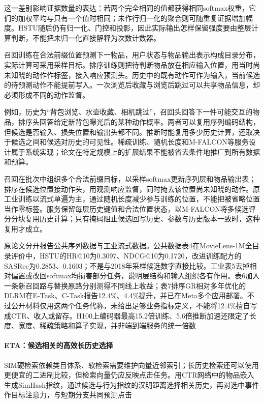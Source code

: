 这一差别影响证据数量的表达：若两个完全相同的值都获得相同softmax权重，它们的加权平均与只有一个值时相同；未作行归一化的聚合则可随重复证据增加幅度。HSTU随后仍有归一化、门控和投影，因此实际输出怎样保留强度要由整层计算判断，不能把未归一化直接解释为次数计数器。

召回训练在合法前缀位置预测下一物品，用户状态与物品输出表示构成目录分布，实际计算可采用采样目标。排序训练则把待判断物品放在相应输入位置，用当时尚未知晓的动作作标签，接入响应预测头。历史中的既有动作可作为输入，当前候选的待预测动作不能提前写入。一次浏览后收藏与浏览后跳过可以共享物品信息，却必须形成不同的动作监督。

例如，历史为“背包浏览、水壶收藏、相机跳过”，召回头回答下一件可能交互的物品，排序头回答给定新背包曝光后的某种动作概率。两者可以复用序列编码结构，但候选是否输入、损失位置和输出头都不同。推断时能复用多少历史计算，还取决于候选之间和候选对历史的可见性。稀疏训练、随机长度和M-FALCON等服务设计属于系统实现；论文在特定规模上的扩展结果不能被省去条件地推广到所有数据和预算。

召回在批次中组织多个合法前缀目标，以采样softmax更新序列层和物品输出表；排序在候选位置接动作头，用观测响应监督，同时掩去该位置尚未知晓的动作。原工业训练以流式单遍为主，通过随机长度减少参与训练的位置，不能把被省略位置当作零标签。服务保留每层历史键值和合法位置状态，以M-FALCON将多候选评分分块复用历史计算；只有掩码阻止候选回写历史、参数与历史版本一致时，这种复用才成立。

原论文分开报告公共序列数据与工业流式数据。公共数据表4在MovieLens-1M全目录评价中，HSTU的HR@10为0.3097、NDCG@10为0.1720，改进训练配方的SASRec为0.2853、0.1603；不是与2018年采样候选数字直接比较。工业表5去掉相对偏置或改回softmax均损害部分任务，说明层结构和输入组织各有作用。表6加入一条新召回路与替换原路分别测得不同线上收益；表7排序GR相对多年优化的DLRM在E-Task、C-Task报告12.4\%、4.4\%提升，并已在Meta多个应用部署。不过公开材料仅用这两个任务代称，未给出足够业务指标定义，不能将12.4\%擅自写成CTR、收入或留存。H100上编码器最高15.2倍训练、5.6倍推断加速还限定了长度、宽度、稀疏策略和算子实现，并非端到端服务的统一倍数

\paragraph{ETA：候选相关的高效长历史选择}
\label{sec:rs-eta}

SIM硬检索依赖类目体系、软检索需要维护向量近邻索引；长历史检索还可以使用更便宜的二进制比较，但检索向量仍应反映点击任务。用CTR网络中的物品嵌入生成SimHash指纹，通过候选与行为指纹的汉明距离选择相关历史，再对选中事件作目标注意力，与短期分支共同预测点击

